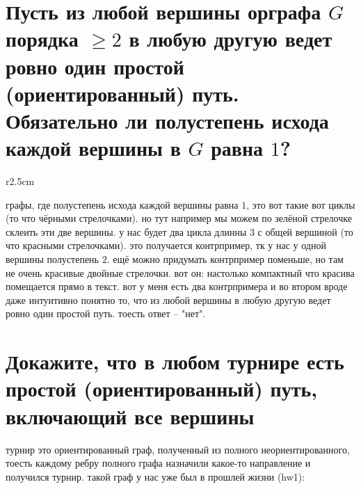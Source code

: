 \documentclass{article}
\begin{document}
  \section{Пусть из любой вершины орграфа $G$ порядка $\geq 2$ в любую другую ведет ровно один простой (ориентированный) путь. Обязательно ли полустепень исхода каждой вершины в $G$ равна $1$?}
  \begin{wrapfigure}{r}{2.5cm}
    \vspace{-1cm}
    \vspace{-1cm}
  \end{wrapfigure}
  графы, где полустепень исхода каждой вершины равна $1$, это вот такие вот циклы (то что чёрными стрелочками).
  но тут например мы можем по зелёной стрелочке склеить эти две вершины.
  у нас будет два цикла длинны $3$ с общей вершиной (то что красными стрелочками).
  это получается контрпример, тк у нас у одной вершины полустепень $2$.
  ещё можно придумать контрпример поменьше, но там не очень красивые двойные стрелочки.
  вот он:
  настолько компактный что красива помещается прямо в текст.
  вот у меня есть два контрпримера и во втором вроде даже интуитивно понятно то,
  что из любой вершины в любую другую ведет ровно один простой путь.
  тоесть ответ -- "{}нет"{}.

  \newpage
  \section{Докажите, что в любом турнире есть простой (ориентированный) путь, включающий все вершины}
  турнир это ориентированный граф, полученный из полного неориентированного,
  тоесть каждому ребру полного графа назначили какое-то направление и получился турнир.
  такой граф у нас уже был в прошлей жизни (hw1):
\end{document}
